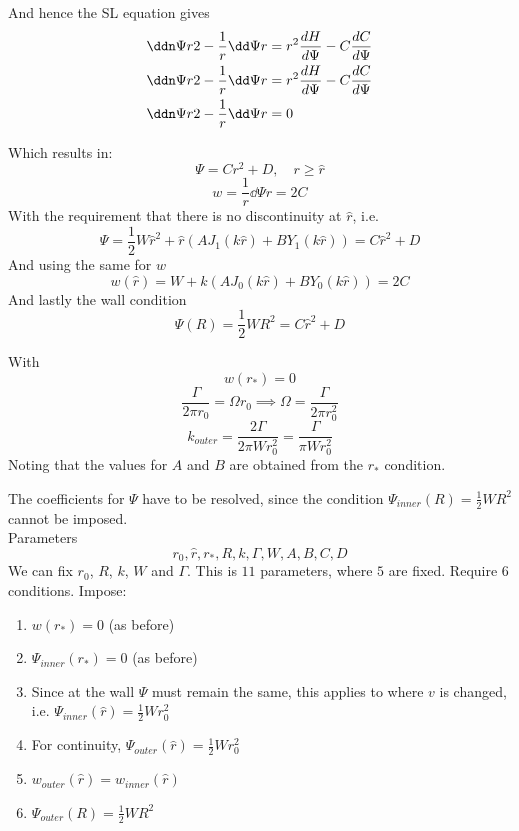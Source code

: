 \documentclass{X:/Documents/Coding/Latex/myreport}
\begin{document}
And hence the SL equation gives
\begin{align*}
 \ddn \Psi r 2 - \frac1r \dd\Psi r &= r^2 \frac{dH}{d\Psi} - C \frac{dC}{d\Psi}\\
 \ddn \Psi r 2 - \frac1r \dd\Psi r &= r^2 \frac{dH}{d\Psi} - C \frac{dC}{d\Psi}\\
\ddn \Psi r 2 - \frac1r \dd\Psi r &=0\\
\end{align*}

Which results in:
\[\Psi = Cr^2 + D, \quad r \geq \hat{r}\]
\[w = \frac1r \dd\Psi r = 2C\]
With the requirement that there is no discontinuity at $\hat{r}$, i.e.
\[\Psi = \frac12 W\hat{r}^2 + \hat{r}\left(AJ_1(k \hat{r}) + BY_1(k\hat{r})\right) = C\hat{r}^2 + D\]
And using the same for $w$
\[w(\hat{r}) = W + k(AJ_0(k\hat{r}) + BY_0(k\hat{r})) = 2C\]
And lastly the wall condition
\[\Psi(R) = \frac12 W R^2 = C\hat{r}^2 +D\]

With
\[w(r_*) = 0\]
\[\frac{\Gamma}{2\pi r_0} = \Omega r_0 \implies \Omega = \frac{\Gamma}{2\pi r_0^2} \]
\[k_{outer} = \frac{2\Gamma}{2\pi W r_0^2} = \frac{\Gamma}{\pi W r_0^2}  \]
Noting that the values for $A$ and $B$ are obtained from the $r_*$ condition.



The coefficients for $\Psi$ have to be resolved, since the condition $\Psi_{inner}(R) = \frac12 WR^2$ cannot be imposed.\\

Parameters
\[r_0,\hat{r}, r_*, R,k, \Gamma, W, A,B,C,D\]
We can fix $r_0$, $R$, $k$, $W$ and $\Gamma$.
This is $11$ parameters, where $5$ are fixed. Require $6$ conditions.
Impose:

\renewcommand{\theenumi}{\arabic{enumi})}    
\begin{enumerate}
    \item \label{rankine::1}$w(r_*) = 0$ (as before)
    \item \label{rankine::2} $\Psi_{inner}(r_*) = 0$ (as before)
    \item\label{rankine::3} Since at the wall $\Psi$ must remain the same, this applies to where $v$ is changed, i.e. $\Psi_{inner}(\hat{r}) = \frac12 W r_0^2$ 
    \item\label{rankine::4} For continuity, $\Psi_{outer}(\hat{r}) = \frac12 W r_0^2$ 
    \item\label{rankine::5} $w_{outer}(\hat{r}) = w_{inner}(\hat{r})$\\
    \item\label{rankine::6} $\Psi_{outer}(R) = \frac12 WR^2$ 
\end{enumerate}
\end{document}
